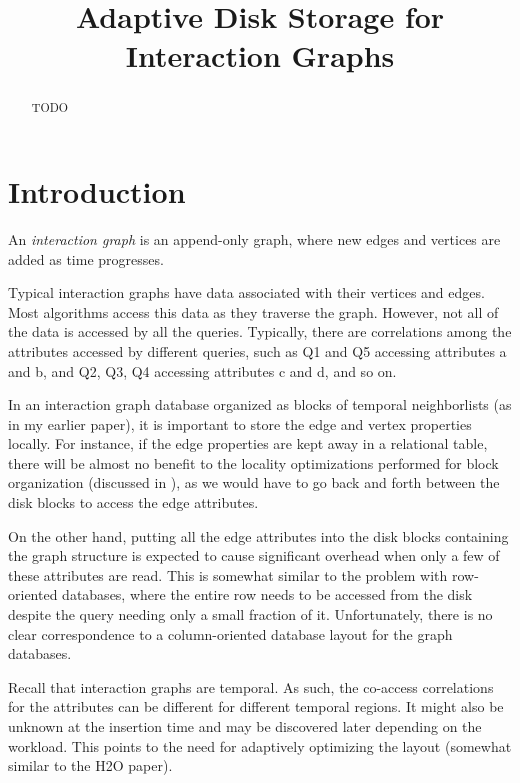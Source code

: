 \documentclass{sig-alternate}
\begin{document}

\title{Adaptive Disk Storage for Interaction Graphs}



\author{ }

\date{}

\maketitle
\begin{abstract}
TODO
\end{abstract}


\section{Introduction}
An \emph{interaction graph} is an append-only graph, where new edges and
vertices are added as time progresses. 
%

%
Typical interaction graphs have data associated with their vertices and edges.
Most algorithms access this data as they traverse the graph. However, not all
of the data is accessed by all the queries. Typically, there are correlations
among the attributes accessed by different queries, such as Q1 and Q5
accessing attributes a and b, and Q2, Q3, Q4 accessing attributes c and d, and
so on.
%

In an interaction graph database organized as blocks of temporal neighborlists
(as in my earlier paper), it is important to store the edge and vertex
properties locally. For  instance, if the edge properties are kept away in a
relational table, there will be almost no benefit to the locality
optimizations performed for block organization (discussed in \cite{gedik14}), as we would have to go back and forth between the disk blocks to
access the edge attributes. 
%

On the other hand, putting all the edge attributes into the disk blocks
containing the graph structure is expected to cause significant overhead when
only a few of these attributes are read. This is somewhat similar to the 
problem with row-oriented databases, where the entire row needs to be accessed
from the disk despite the query needing only a small fraction of it.
Unfortunately, there is no clear correspondence to a column-oriented database
layout for the graph databases.
%

Recall that interaction graphs are temporal. As such, the co-access
correlations for the attributes can be different for different temporal
regions. It might also  be unknown at the insertion time and may be discovered
later depending on the workload. This points to the need for adaptively
optimizing the layout (somewhat similar to the H2O paper).
%
\end{document}
